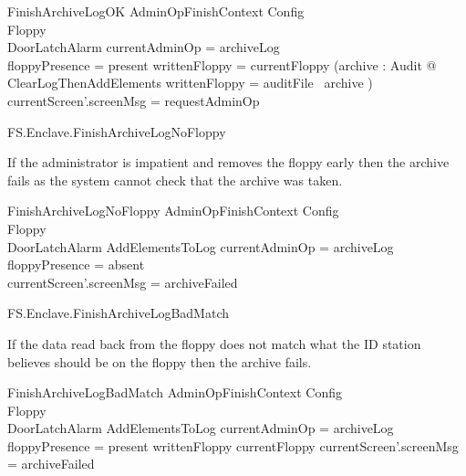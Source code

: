 \begin{schema}{FinishArchiveLogOK}
        AdminOpFinishContext
\also
        \Xi Config
\\      \Xi Floppy
\\      \Xi DoorLatchAlarm
\where
        \The currentAdminOp = archiveLog
\\      floppyPresence = present
\also
        writtenFloppy = currentFloppy
\also
        (\exists archive : \finset Audit @ ClearLogThenAddElements
         \land
        writtenFloppy = auditFile~ archive )
\also
        currentScreen'.screenMsg = requestAdminOp
\end{schema}


\begin{traceunit}{FS.Enclave.FinishArchiveLogNoFloppy}
\end{traceunit}

If the administrator is impatient and removes the floppy early then
the archive fails as the system cannot check that the archive was taken.

\begin{schema}{FinishArchiveLogNoFloppy}
        AdminOpFinishContext
\also
        \Xi Config
\\      \Xi Floppy
\\      \Xi DoorLatchAlarm
\also
        AddElementsToLog
\where
       \The currentAdminOp = archiveLog
\\      floppyPresence = absent
\also
\\      currentScreen'.screenMsg = archiveFailed
\end{schema}


\begin{traceunit}{FS.Enclave.FinishArchiveLogBadMatch}
\end{traceunit}


If the data read back from the floppy does not match what the ID
station believes should be on the floppy then the archive fails.

\begin{schema}{FinishArchiveLogBadMatch}
        AdminOpFinishContext
\also
        \Xi Config
\\      \Xi Floppy
\\      \Xi DoorLatchAlarm
\also
        AddElementsToLog
\where
        \The currentAdminOp = archiveLog
\\      floppyPresence = present
\also
        writtenFloppy \neq currentFloppy
\also
        currentScreen'.screenMsg = archiveFailed
\end{schema}

